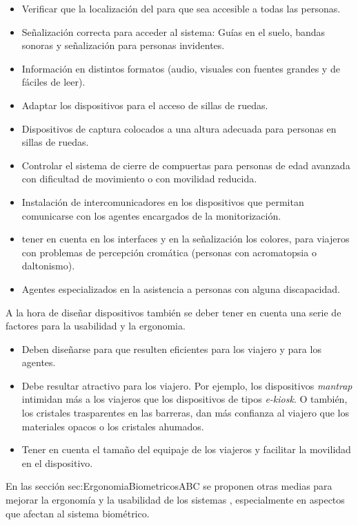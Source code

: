 \begin{itemize}
    \item 
    Verificar que la localización del  para que sea accesible a todas las personas.
    \item
    Señalización correcta para acceder al sistema: Guías en el suelo, bandas sonoras y señalización para personas invidentes.
    \item
    Información en distintos formatos (audio, visuales con fuentes grandes y de fáciles de leer).
    \item
    Adaptar los dispositivos para el acceso de sillas de ruedas.
    \item
    Dispositivos de captura colocados a una altura adecuada para personas en sillas de ruedas.
    \item
    Controlar el sistema de cierre de compuertas para personas de edad avanzada con dificultad de movimiento o con movilidad reducida.
    \item
    Instalación de intercomunicadores en los dispositivos que permitan comunicarse con los agentes encargados de la monitorización.
    \item
    tener en cuenta en los interfaces y en la señalización los colores, para viajeros con problemas de percepción cromática (personas con acromatopsia o daltonismo).
    \item
    Agentes especializados en la asistencia a personas con alguna discapacidad.
\end{itemize}

A la hora de diseñar dispositivos  también se deber tener en cuenta una serie de factores para la usabilidad y la \gls{ergonomia}. 

\begin{itemize}
    \item 
    Deben diseñarse para que resulten eficientes para los viajero y para los agentes.
    \item
    Debe resultar atractivo para los viajero. Por ejemplo, los dispositivos \textit{\gls{mantrap}} intimidan más a los viajeros que los dispositivos de tipos \textit{\gls{e-kiosk}}. O también, los cristales trasparentes en las barreras, dan más confianza al viajero que los materiales opacos o los cristales ahumados.
    \item
    Tener en cuenta el tamaño del equipaje de los viajeros y facilitar la movilidad en el dispositivo.
\end{itemize}

En las sección sec:ErgonomiaBiometricosABC se proponen otras medias para mejorar la ergonomía y la usabilidad de los sistemas , especialmente en aspectos que afectan al sistema biométrico.


